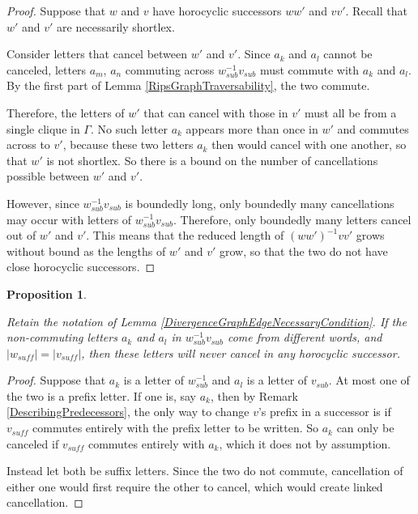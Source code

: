 \documentclass{amsart}
\newtheorem{proposition}[theorem]{Proposition}
\theoremstyle{definition}
\theoremstyle{remark}
\begin{document}
	\begin{proof}
		
		Suppose that $w$ and $v$ have horocyclic successors $ww'$ and $vv'$. Recall that $w'$ and $v'$ are necessarily shortlex.
		
		Consider letters that cancel between $w'$ and $v'$. Since $a_k$ and $a_l$ cannot be canceled, letters $a_m$, $a_n$ commuting across $w_{sub}^{-1}v_{sub}$ must commute with $a_k$ and $a_l$. By the first part of Lemma \ref{RipsGraphTraversability}, the two commute.
		
		Therefore, the letters of $w'$ that can cancel with those in $v'$ must all be from a single clique in $\Gamma$. No such letter $a_k$ appears more than once in $w'$ and commutes across to $v'$, because these two letters $a_k$ then would cancel with one another, so that $w'$ is not shortlex. So there is a bound on the number of cancellations possible between $w'$ and $v'$.
		
		However, since $w_{sub}^{-1}v_{sub}$ is boundedly long, only boundedly many cancellations may occur with letters of $w_{sub}^{-1}v_{sub}$. Therefore, only boundedly many letters cancel out of $w'$ and $v'$. This means that the reduced length of $(ww')^{-1}vv'$ grows without bound as the lengths of $w'$ and $v'$ grow, so that the two do not have close horocyclic successors.	
	\end{proof}
	
	\begin{proposition} \label{NonCommutingLettersInDifferentWords}
		
		Retain the notation of Lemma \ref{DivergenceGraphEdgeNecessaryCondition}. If the non-commuting letters $a_k$ and $a_l$ in $w_{sub}^{-1}v_{sub}$ come from different words, and $|w_{suff}|=|v_{suff}|$, then these letters will never cancel in any horocyclic successor.
		
	\end{proposition}
	
	\begin{proof}
		
		Suppose that $a_k$ is a letter of $w_{sub}^{-1}$ and $a_l$ is a letter of $v_{sub}$. At most one of the two is a prefix letter. If one is, say $a_k$, then by Remark \ref{DescribingPredecessors}, the only way to change $v$'s prefix in a successor is if $v_{suff}$ commutes entirely with the prefix letter to be written. So $a_k$ can only be canceled if $v_{suff}$ commutes entirely with $a_k$, which it does not by assumption.
		
		Instead let both be suffix letters. Since the two do not commute, cancellation of either one would first require the other to cancel, which would create linked cancellation.	
	\end{proof}
	
\end{document}

